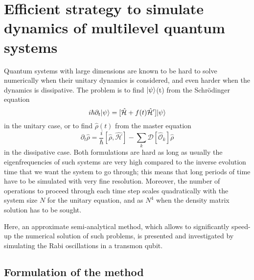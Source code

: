 \chapter{Efficient strategy to simulate dynamics of multilevel quantum systems}

Quantum systems with large dimensions are known to be hard to solve numerically when their unitary dynamics is considered, and even harder when the dynamics is dissipative. The problem is to find ${\lvert\psi\rangle}$(t) from the Schrödinger equation
\begin{equation*}
i\hbar \partial_t {\lvert\psi\rangle} = [\hat{\mathcal{H}} + f(t)\hat{\mathcal{H}}']\lvert\psi\rangle
\end{equation*}
in the unitary case, or to find $\hat \rho(t)$ from the master equation
\[
 \partial_t{\hat \rho} = \frac{i}{\hbar} [\hat\rho, \hat{\mathcal{H}}] - \sum_k \mathcal{D}[\hat{\mathcal{O}}_k]\hat \rho
\]
in the dissipative case. Both formulations are hard as long as usually the eigenfrequencies of such systems are very high compared to the inverse evolution time that we want the system to go through; this means that long periods of time have to be simulated with very fine resolution. Moreover, the number of operations to proceed through each time step scales quadratically with the system size $N$ for the unitary equation, and as $N^4$ when the density matrix solution has to be sought.   

Here, an approximate semi-analytical method, which allows to significantly speed-up the numerical solution of such problems, is presented and investigated by simulating the Rabi oscillations in a transmon qubit.

\section{Formulation of the method}

